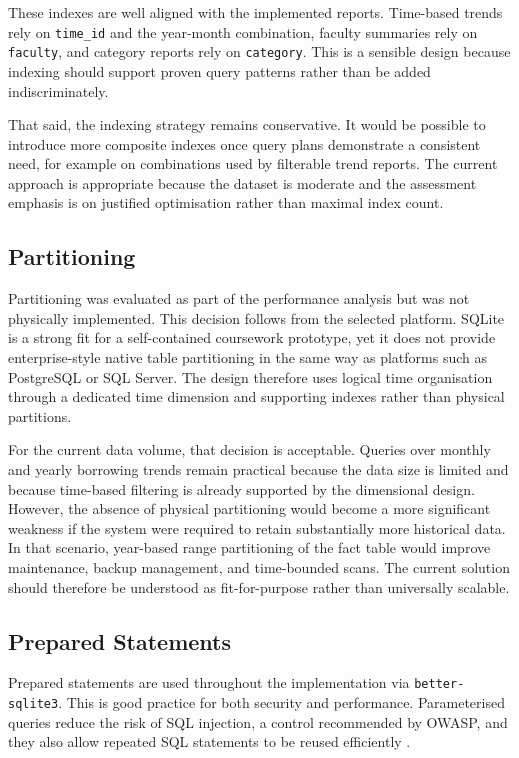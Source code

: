 \documentclass[12pt,a4paper]{article}
\begin{document}
These indexes are well aligned with the implemented reports. Time-based trends rely on \texttt{time\_id} and the year-month combination, faculty summaries rely on \texttt{faculty}, and category reports rely on \texttt{category}. This is a sensible design because indexing should support proven query patterns rather than be added indiscriminately.

That said, the indexing strategy remains conservative. It would be possible to introduce more composite indexes once query plans demonstrate a consistent need, for example on combinations used by filterable trend reports. The current approach is appropriate because the dataset is moderate and the assessment emphasis is on justified optimisation rather than maximal index count.

\subsection{Partitioning}
Partitioning was evaluated as part of the performance analysis but was not physically implemented. This decision follows from the selected platform. SQLite is a strong fit for a self-contained coursework prototype, yet it does not provide enterprise-style native table partitioning in the same way as platforms such as PostgreSQL or SQL Server. The design therefore uses logical time organisation through a dedicated time dimension and supporting indexes rather than physical partitions.

For the current data volume, that decision is acceptable. Queries over monthly and yearly borrowing trends remain practical because the data size is limited and because time-based filtering is already supported by the dimensional design. However, the absence of physical partitioning would become a more significant weakness if the system were required to retain substantially more historical data. In that scenario, year-based range partitioning of the fact table would improve maintenance, backup management, and time-bounded scans. The current solution should therefore be understood as fit-for-purpose rather than universally scalable.

\subsection{Prepared Statements}
Prepared statements are used throughout the implementation via \texttt{better-sqlite3}. This is good practice for both security and performance. Parameterised queries reduce the risk of SQL injection, a control recommended by OWASP, and they also allow repeated SQL statements to be reused efficiently \citep{owaspSql,owaspParam}.
\end{document}
